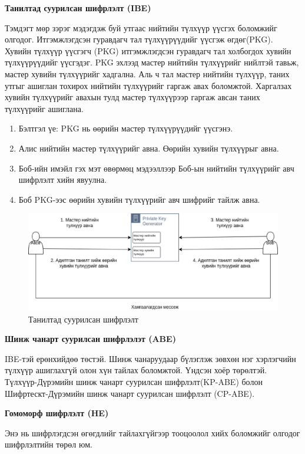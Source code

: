 \textbf{Танилтад суурилсан шифрлэлт (IBE)} 

Тэмдэгт мөр зэрэг мэдэгдэж буй утгаас нийтийн түлхүүр үүсгэх боломжийг олгодог. Итгэмжлэгдсэн гуравдагч тал түлхүүрүүдийг үүсгэж өгдөг(PKG). 
Хувийн түлхүүр үүсгэгч (PKG) итгэмжлэгдсэн гуравдагч тал холбогдох хувийн түлхүүрүүдийг үүсгэдэг. PKG эхлээд мастер нийтийн түлхүүрийг нийлтэй тавьж, мастер хувийн түлхүүрийг хадгална. Аль ч тал мастер нийтийн түлхүүр, таних утгыг ашиглан тохирох нийтийн түлхүүрийг гаргаж авах боломжтой. Харгалзах хувийн түлхүүрийг авахын тулд мастер түлхүүрээр гаргаж авсан таних түлхүүрийг ашиглана.

\begin{enumerate}
    \item Бэлтгэл үе: PKG нь өөрийн мастер түлхүүрүүдийг үүсгэнэ.
    \item Алис нийтийн мастер түлхүүрийг авна. Өөрийн хувийн түлхүүрыг авна.
    \item Боб-ийн имэйл гэх мэт өвөрмөц мэдээллээр Боб-ын нийтийн түлхүүрийг авч шифрлэлт хийн явуулна.
    \item Боб PKG-ээс өөрийн хувийн түлхүүрийг авч шифрийг тайлж авна.
\end{enumerate}

\begin{figure}[ht]
\centering
\includegraphics[scale=0.6]{Figures/IBE.eps}
\caption[IBE]{Танилтад суурилсан шифрлэлт}
\label{fig:IBE}
\end{figure}



\textbf{Шинж чанарт суурилсан шифрлэлэт (ABE)}

IBE-тэй ерөнхийдөө төстэй. Шинж чанаруудаар бүлэглэж зөвхөн нэг хэрлэгчийн түлхүүр ашиглахгүй олон хүн тайлах боломжтой.
Үндсэн хоёр төрөлтэй. Түлхүүр-Дүрэмийн шинж чанарт суурилсан шифрлэлт(KP-ABE) болон Шифртескт-Дүрэмийн шинж чанарт суурилсан шифрлэлт (CP-ABE).  

\textbf{Гомоморф шифрлэлт (HE)}

Энэ нь шифрлэгдсэн өгөгдлийг тайлахгүйгээр тооцоолол хийх боломжийг олгодог шифрлэлтийн төрөл юм.


